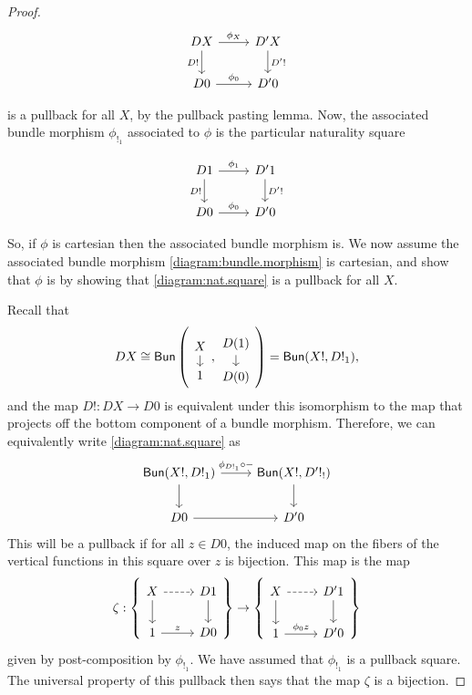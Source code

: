 \documentclass[11pt, article, one side]{memoir}
\theoremstyle{theorem}
\theoremstyle{definition}
\theoremstyle{remark}
\newcommand{\Cat}[1]{\mathsf{#1}}%
\newcommand{\bun}{\Cat{Bun}}
\begin{document}
\begin{proof}
\begin{equation}\label{diagram:nat.square}
\begin{tikzcd}
DX \arrow[r, "\phi_X"] \arrow[d, "D!"'] & D'X \arrow[d, "D'!"] \\
D0 \arrow[r, "\phi_0"] & D'0
\end{tikzcd}
\end{equation}

is a pullback for all $X$, by the pullback pasting lemma. Now, the associated bundle morphism $\phi_{!_1}$ associated to $\phi$ is the particular naturality square

\begin{equation}\label{diagram:bundle.morphism}
\begin{tikzcd}
D1 \arrow[r, "\phi_1"] \arrow[d, "D!"'] & D'1 \arrow[d, "D'!"] \\
D0 \arrow[r, "\phi_0"] & D'0
\end{tikzcd}
\end{equation}

So, if $\phi$ is cartesian then the associated bundle morphism is. We now assume the associated bundle morphism \cref{diagram:bundle.morphism} is cartesian, and show that $\phi$ is by showing that \cref{diagram:nat.square} is a pullback for all $X$.

Recall that $$DX \cong \bun\left(\begin{tikzcd}[sep=small] X \arrow[d] \\ 1 \end{tikzcd}, \begin{tikzcd}[sep=small] D(1) \arrow[d] \\ D(0) \end{tikzcd} \right) = \bun(X!, D!_1),$$ and the map $D! : DX \to D0$ is equivalent under this isomorphism to the map that projects off the bottom component of a bundle morphism. Therefore, we can equivalently write \cref{diagram:nat.square} as
\begin{equation}
    \begin{tikzcd}
    \bun(X!, D!_1) \arrow[d] \arrow[r, "\phi_{D!_1} \circ -"] & \bun(X!, D'!_!) \arrow[d] \\
    D0 \arrow[r] & D'0
    \end{tikzcd}
\end{equation}
This will be a pullback if for all $z \in D0$, the induced map on the fibers of the vertical functions in this square over $z$ is bijection. This map is the map
\[
\zeta : \left\{ \begin{tikzcd}
X \arrow[r, dashed] \arrow[d] & D1 \arrow[d] \\
1 \arrow[r, "z"] & D0
\end{tikzcd} \right\} \to \left\{\begin{tikzcd}
X \arrow[r, dashed] \arrow[d] & D'1 \arrow[d] \\
1 \arrow[r, "\phi_0 z"] & D'0
\end{tikzcd} \right\}
\]
given by post-composition by $\phi_{!_1}$. We have assumed that $\phi_{!_1}$ is a pullback square. The universal property of this pullback then says that the map $\zeta$ is a bijection.
\end{proof}
\end{document}
